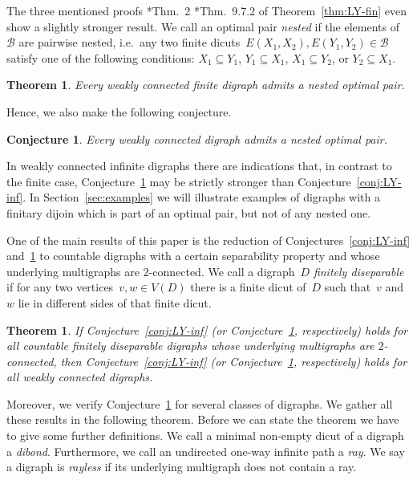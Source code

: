 \documentclass[reqno, 12pt]{amsart}
\numberwithin{equation}{section}
\numberwithin{figure}{section}
\theoremstyle{plain}
\newtheorem{theorem}[thm]{Theorem}
\newtheorem{conjecture}[thm]{Conjecture}
\theoremstyle{definition}
\begin{document}
The three mentioned proofs 
\cite{lucc-young_paper}
\cite{lovasz}*{Thm.~2} 
\cite{frank_book}*{Thm.~9.7.2} 
of Theorem~\ref{thm:LY-fin} even show a slightly stronger result.
We call an optimal pair \emph{nested} if the elements of~$\mathcal{B}$ are pairwise nested, 
i.e.~any two finite dicuts~${E(X_1, X_2), E(Y_1, Y_2) \in \mathcal{B}}$ satisfy one of the following conditions: 
${X_1 \subseteq Y_1}$, 
${Y_1 \subseteq X_1}$, 
${X_1 \subseteq Y_2}$, or 
${Y_2 \subseteq X_1}$.

\begin{theorem}
    \label{thm:LY-fin-nested}
    \cite{lucc-young_paper}
    Every weakly connected finite digraph admits a nested optimal pair.
\end{theorem}

Hence, we also make the following conjecture.

\begin{conjecture}
    \label{conj:LY-inf-nested}
    Every weakly connected digraph admits a nested optimal pair.
\end{conjecture}

In weakly connected infinite digraphs there are indications that, in contrast to the finite case, Conjecture~\ref{conj:LY-inf-nested} may be strictly stronger than Conjecture~\ref{conj:LY-inf}. 
In Section~\ref{sec:examples} we will illustrate examples of digraphs with a finitary dijoin which is part of an optimal pair, but not of any nested one. 

\vspace{0.2cm}

One of the main results of this paper is the reduction of Conjectures~\ref{conj:LY-inf} and~\ref{conj:LY-inf-nested} to countable digraphs with a certain separability property and whose underlying multigraphs are $2$-connected. 
We call a digraph~$D$ \emph{finitely diseparable} if for any two vertices~${v, w \in V(D)}$ there is a finite dicut of~$D$ such that~$v$ and~$w$ lie in different sides of that finite dicut. 

\begin{theorem}
    \label{thm:reduction}
    If Conjecture~\ref{conj:LY-inf} (or Conjecture~\ref{conj:LY-inf-nested}, respectively) holds for all countable finitely diseparable digraphs whose underlying multigraphs are $2$-connected, then Conjecture~\ref{conj:LY-inf} (or Conjecture~\ref{conj:LY-inf-nested}, respectively) holds for all weakly connected digraphs. 
\end{theorem}

Moreover, we verify Conjecture~\ref{conj:LY-inf-nested} for several classes of digraphs. 
We gather all these results in the following theorem.  
Before we can state the theorem we have to give some further definitions.
We call a minimal non-empty dicut of a digraph a \emph{dibond}. 
Furthermore, we call an undirected one-way infinite path a \emph{ray}. 
We say a digraph is \emph{rayless} if its underlying multigraph does not contain a ray.
\end{document}
